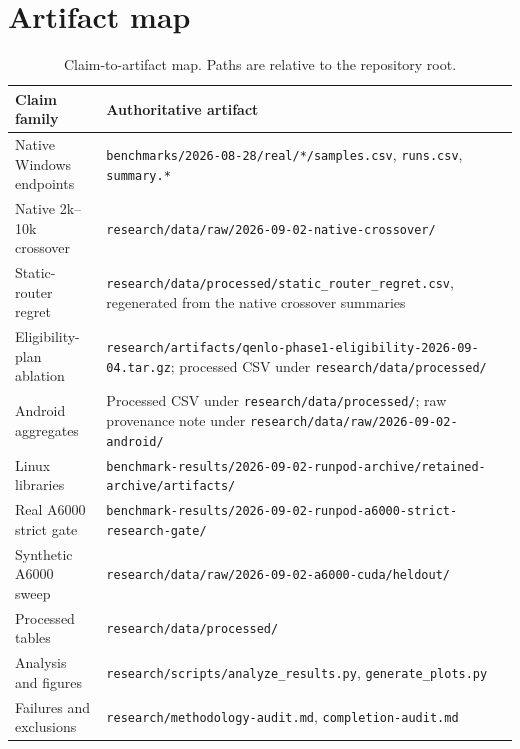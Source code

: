 \section{Artifact map}\label{sec:artifact}
\begin{table}[H]
\centering\scriptsize
\caption{Claim-to-artifact map. Paths are relative to the repository root.}
\begin{tabular}{p{.30\linewidth}p{.61\linewidth}}
\toprule
Claim family & Authoritative artifact \\
\midrule
Native Windows endpoints & \texttt{benchmarks/2026-08-28/real/*/samples.csv}, \texttt{runs.csv}, \texttt{summary.*} \\
Native 2k--10k crossover & \texttt{research/data/raw/2026-09-02-native-crossover/} \\
Static-router regret & \texttt{research/data/processed/static\_router\_regret.csv}, regenerated from the native crossover summaries \\
Eligibility-plan ablation & \texttt{research/artifacts/qenlo-phase1-eligibility-2026-09-04.tar.gz}; processed CSV under \texttt{research/data/processed/} \\
Android aggregates & Processed CSV under \texttt{research/data/processed/}; raw provenance note under \texttt{research/data/raw/2026-09-02-android/} \\
Linux libraries & \texttt{benchmark-results/2026-09-02-runpod-archive/retained-archive/artifacts/} \\
Real A6000 strict gate & \texttt{benchmark-results/2026-09-02-runpod-a6000-strict-research-gate/} \\
Synthetic A6000 sweep & \texttt{research/data/raw/2026-09-02-a6000-cuda/heldout/} \\
Processed tables & \texttt{research/data/processed/} \\
Analysis and figures & \texttt{research/scripts/analyze\_results.py}, \texttt{generate\_plots.py} \\
Failures and exclusions & \texttt{research/methodology-audit.md}, \texttt{completion-audit.md} \\
\bottomrule
\end{tabular}
\end{table}

